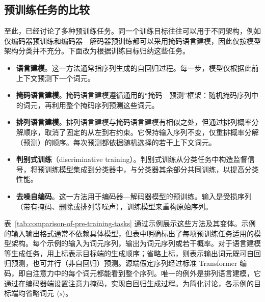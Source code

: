 \subsection{预训练任务的比较}

\noindent 至此，已经讨论了多种预训练任务。同一个训练目标往往可以用于不同架构，例如仅编码器预训练和编码器—解码器预训练都可以采用掩码语言建模，因此仅按模型架构分类并不充分。下面改为根据训练目标归纳这些任务。

\begin{itemize}
\item \vspace{0.5em} \textbf{语言建模}。这一方法通常指序列生成的自回归过程。每一步，模型仅根据此前上下文预测下一个词元。
\item \vspace{0.3em} \textbf{掩码语言建模}。掩码语言建模遵循通用的“掩码—预测”框架：随机掩码序列中的词元，再利用整个掩码序列预测这些词元。
\item \vspace{0.3em} \textbf{排列语言建模}。排列语言建模与掩码语言建模有相似之处，但通过排列概率分解顺序，取消了固定的从左到右约束。它保持输入序列不变，仅重排概率分解（预测）的顺序。每次预测都依据随机选择的若干上下文词元。
\item \vspace{0.3em} \textbf{判别式训练}（discriminative training）。判别式训练从分类任务中构造监督信号，将预训练模型集成到分类器中，与分类器其余部分共同训练，以提高分类性能。
\item \vspace{0.3em} \textbf{去噪自编码}。这一方法用于编码器—解码器模型的预训练。输入是受损序列（带有掩码、删除或排列等噪声），训练模型来重构原始序列。
\end{itemize}
\vspace{0.5em}

表~\ref{tab:comparison-of-pre-training-tasks} 通过示例展示这些方法及其变体。示例的输入输出格式通常不依赖具体模型，但表中明确标出了每项预训练任务适用的模型架构。每个示例的输入为词元序列，输出为词元序列或若干概率。对于语言建模等生成任务，用上标表示目标端的生成顺序；省略上标，则表示输出词元既可自回归预测，也可并行（非自回归）预测。源端假定序列经过标准 Transformer 编码，即自注意力中的每个词元都能看到整个序列。唯一的例外是排列语言建模，它通过在编码器端设置注意力掩码，实现自回归生成过程。为简化讨论，各示例的目标端均省略词元 $\langle s \rangle$。

